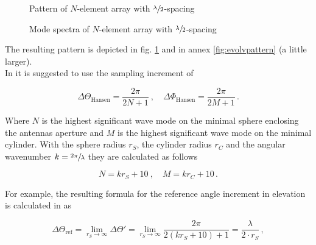 \begin{figure}[h]
  \centering
  \centering
  \centering
\caption{Pattern of $N$-element array with $\sfrac{\lambda}{2}$-spacing}
\label{fig:evolvpattern2}
\end{figure}

\begin{figure}[h]
  \centering
  \centering
  \centering
\caption{Mode spectra of $N$-element array with $\sfrac{\lambda}{2}$-spacing}
\label{fig:evolvpattern3}
\end{figure}

The resulting pattern is depicted in fig. \ref{fig:evolvpattern2} and in annex \ref{fig:evolvpattern} (a little larger).\\
In \cite{hansen} it is suggested to use the sampling increment of

\begin{equation}
\Delta\Theta_\text{Hansen} = \frac{2\pi}{2N+1}\ , \quad \Delta\Phi_\text{Hansen}=\frac{2\pi}{2M+1}\,.
\label{eq:refahansen}
\end{equation}

Where $N$ is the highest significant wave mode on the minimal sphere enclosing the antennas aperture and $M$ is the highest significant wave mode on the minimal cylinder. With the sphere radius $r_S$, the cylinder radius $r_C$ and the angular wavenumber $k = \sfrac{2\pi}{\lambda}$ they are calculated as follows

\begin{equation}
N = kr_S+10\ , \quad M = kr_C+10\,.
\end{equation}

For example, the resulting formula for the reference angle increment in elevation is calculated in \cite{2018arXiv180310993F} as

\begin{equation}
\Delta\Theta_{\text{ref}} = \lim_{r_S \to \infty}\Delta\Theta' = \lim_{r_S \to \infty} \frac{2\pi}{2\left(kr_S+10\right)+1} = \frac{\lambda}{2\cdot r_S}\,,
\label{eq:hansenrefa}
\end{equation}

